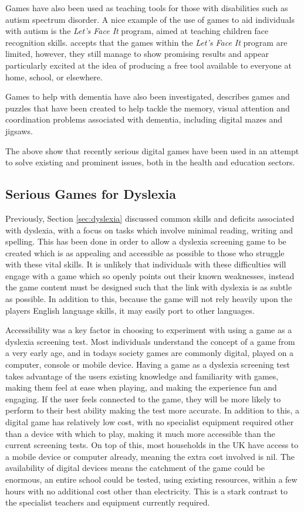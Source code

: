 \documentclass[journal]{IEEEtran}
\begin{document}
Games have also been used as teaching tools for those with disabilities such as autism spectrum disorder. A nice example of the use of games to aid individuals with autism is the \emph{Let's Face It} program, aimed at teaching children face recognition skills\cite{faceit}. \cite{faceit} accepts that the games within the \emph{Let's Face It} program are limited, however, they still manage to show promising results and appear particularly excited at the idea of producing a free tool available to everyone at home, school, or elsewhere. 

Games to help with dementia have also been investigated,
\cite{dementia} describes games and puzzles that have been created to help tackle the memory, visual attention and coordination problems associated with dementia, including digital mazes and jigsaws.

The above show that recently serious digital games have been used in an attempt to solve existing and prominent issues, both in the health and education sectors.

\subsection{Serious Games for Dyslexia}
Previously, Section \ref{sec:dyslexia} discussed common skills and deficits associated with dyslexia, with a focus on tasks which involve minimal reading, writing and spelling. This has been done in order to allow a dyslexia screening game to be created which is as appealing and accessible as possible to those who struggle with these vital skills. It is unlikely that individuals with these difficulties will engage with a game which so openly points out their known weaknesses, instead the game content must be designed such that the link with dyslexia is as subtle as possible. In addition to this, because the game will not rely  heavily upon the players English language skills, it may easily port to other languages.

Accessibility was a key factor in choosing to experiment with using a game as a dyslexia screening test. Most individuals understand the concept of a game from a very early age, and in todays society games are commonly digital, played on a computer, console or mobile device. %
Having a game as a dyslexia screening test takes advantage of the users existing knowledge and familiarity with games, making them feel at ease when playing, and making the experience fun and engaging. If the user feels connected to the game, they will be more likely to perform to their best ability making the test more accurate. In addition to this, a digital game has relatively low cost, with no specialist equipment 
required other than a device with which to play, making it much more accessible than the current screening tests. On top of this, most households in the UK have access to a mobile device or computer already, meaning the extra cost involved is nil\cite{2013GamesData}. 
The availability of digital devices means the catchment of the game could be enormous, an entire school could be tested, using existing resources, within a few hours with no additional cost other than electricity. This is a stark contrast to the specialist teachers and equipment currently required.
\end{document}
